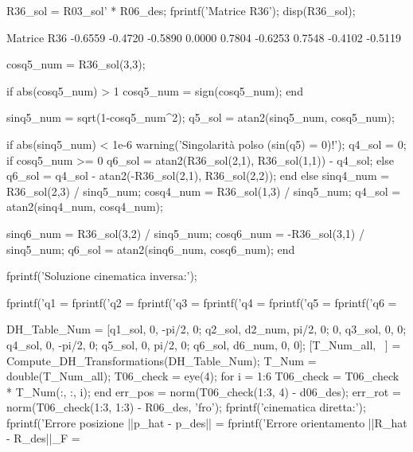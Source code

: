 \documentclass[11pt, a4paper]{article}
\begin{document}
\newpage
\begin{matlabcode}
R36_sol = R03_sol' * R06_des;
fprintf('Matrice R36');
disp(R36_sol);
\end{matlabcode}
\begin{matlaboutput}
Matrice R36
   -0.6559   -0.4720   -0.5890
    0.0000    0.7804   -0.6253
    0.7548   -0.4102   -0.5119
\end{matlaboutput}
\begin{matlabcode}
cosq5_num = R36_sol(3,3);

if abs(cosq5_num) > 1
    cosq5_num = sign(cosq5_num);
end

sinq5_num = sqrt(1-cosq5_num^2);
q5_sol = atan2(sinq5_num, cosq5_num);

if abs(sinq5_num) < 1e-6
    warning('Singolarità polso (sin(q5) = 0)!');
    q4_sol = 0; %
    if cosq5_num >= 0
        q6_sol = atan2(R36_sol(2,1), R36_sol(1,1)) - q4_sol;
    else
        q6_sol = q4_sol - atan2(-R36_sol(2,1), R36_sol(2,2));
    end
else
    sinq4_num = R36_sol(2,3) / sinq5_num;
    cosq4_num = R36_sol(1,3) / sinq5_num;
    q4_sol = atan2(sinq4_num, cosq4_num);

    sinq6_num = R36_sol(3,2) / sinq5_num;
    cosq6_num = -R36_sol(3,1) / sinq5_num;
    q6_sol = atan2(sinq6_num, cosq6_num);
end

fprintf('Soluzione cinematica inversa:\n');

fprintf('q1 = %
fprintf('q2 = %
fprintf('q3 = %
fprintf('q4 = %
fprintf('q5 = %
fprintf('q6 = %

DH_Table_Num = [q1_sol, 0,      -pi/2, 0;
                q2_sol, d2_num,  pi/2, 0;
                0,      q3_sol,  0,    0;
                q4_sol, 0,      -pi/2, 0;
                q5_sol, 0,       pi/2, 0;
                q6_sol, d6_num,  0,    0];
[T_Num_all, ~] = Compute_DH_Transformations(DH_Table_Num);
T_Num = double(T_Num_all);
T06_check = eye(4);
for i = 1:6
    T06_check = T06_check * T_Num(:, :, i);
end
err_pos = norm(T06_check(1:3, 4) - d06_des);
err_rot = norm(T06_check(1:3, 1:3) - R06_des, 'fro');
fprintf('\nVerifica cinematica diretta:\n');
fprintf('Errore posizione ||p_hat - p_des||   = %
fprintf('Errore orientamento ||R_hat - R_des||_F = %
\end{matlabcode}
\end{document}
